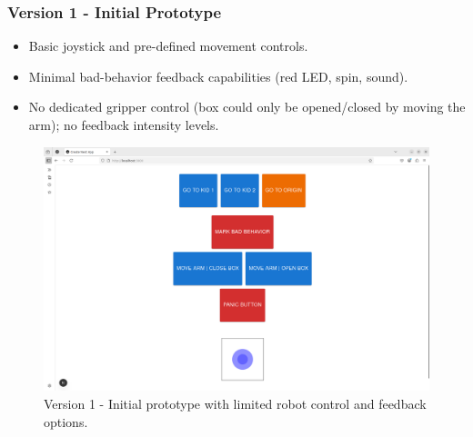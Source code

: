\documentclass[a4paper]{usiinfbachelorproject}
\begin{document}
\subsubsection*{\textbf{Version 1 - Initial Prototype}}
\begin{itemize}
    \item Basic joystick and pre-defined movement controls.
    \item Minimal bad-behavior feedback capabilities (red LED, spin, sound).
    \item No dedicated gripper control (box could only be opened/closed by moving the arm); no feedback intensity levels.
\end{itemize}
\begin{figure}[H]
    \centering
    \includegraphics[width=0.8\linewidth]{figures/dashboard_v1.png}
    \caption{Version 1 - Initial prototype with limited robot control and feedback options.}
    \label{fig:dashboard-v1}
\end{figure}
\end{document}
